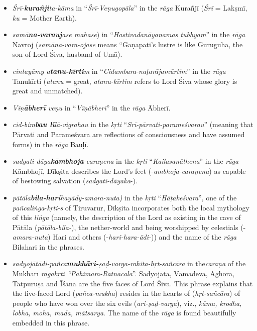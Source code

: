 \begin{itemize}
\itemsep=0pt
\item \textit{Śrī-\textbf{kurañji}ta-kāma} in “\textit{Śrī-Veṇugopāla}” in the \textit{rāga} Kurañjī (\textit{Śrī} = Lakṣmī, \textit{ku} = Mother Earth).

 \item \textit{samā\textbf{na-varauj}ase mahase}) in “\textit{Hastivadanāyanamas tubhyam}” in the \textit{rāga} Navroj (\textit{samāna-vara-ojase} means “Gaṇapati’s lustre is like Guruguha, the son of Lord Śiva, husband of Umā).

 \item \textit{cintayāmy a\textbf{tanu-kīrti}m} in “\textit{Cidambara-naṭarājamūrtim}” in the \textit{rāga} Tanukīrti (\textit{atanu} = great, \textit{atanu-kīrtim} refers to Lord Śiva whose glory is great and unmatched).

 \item \textit{Vīṇ\textbf{ābherī} veṇu} in “\textit{Vīṇābherī}” in the \textit{rāga} Ābherī.

 \item \textit{cid-bim\textbf{bau lī}lā-vigrahau} in the \textit{kṛti} “\textit{Srī-pārvati-parameśvarau}” (meaning that Pārvati and Parameśvara are reflections of consciousness and have assumed forms) in the \textit{rāga} Bauḷī.

 \item \textit{sadgati-dāya\textbf{kāmbhoja}-caraṇena} in the \textit{kṛti} “\textit{Kailasanāthena}” in the \textit{rāga} Kāmbhojī, Dīkṣita describes the Lord’s feet (-\textit{ambhoja-caraṇena}) as capable of bestowing salvation (\textit{sadgati-dāyaka}-).

 \item \textit{pātāla\textbf{bila-hari}hayādy-amara-nuta)} in the \textit{kṛti} “\textit{Hāṭakeśvara}”, one of the \textit{pañcaliṅga}-\textit{kṛti-s} of Tiruvarur, Dīkṣita incorporates both the local mythology of this \textit{liṅga} (namely, the description of the Lord as existing in the cave of Pātāla (\textit{pātāla-bila-}), the nether-world and being worshipped by celestials (-\textit{amara-nuta}) Hari and others (-\textit{hari-hara-ādi-})) and the name of the \textit{rāga} Bilahari in the phrases.

 \item \textit{sadyojātādi-pañca\textbf{mukhāri-}ṣaḍ-varga-rahita-hṛt-sañcāra} in the\break \textit{caraṇa} of the Mukhārī\textit{ rāgakṛti “Pāhimām-Ratnācala}”. Sadyojāta, Vāmadeva, Aghora, Tatpuruṣa and Īśāna are the five faces of Lord Śiva. This phrase explains that the five-faced Lord (\textit{pañca-mukha}) resides in the hearts of (\textit{hṛt-sañcāra}) of people who have won over the six evils (\textit{ari-ṣaḍ-varga}), viz., \textit{kāma, krodha, lobha, moha, mada, mātsarya}. The name of the \textit{rāga} is found beautifully embedded in this phrase.


\end{itemize}
